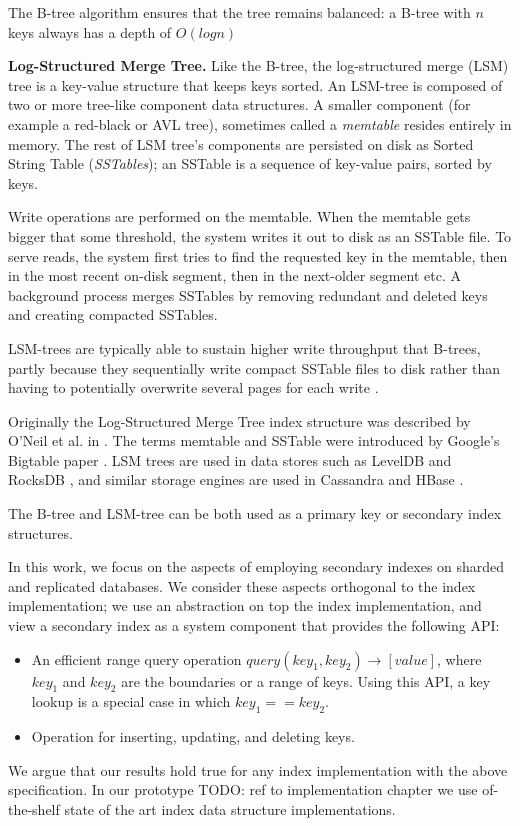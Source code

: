 The B-tree algorithm ensures that the tree remains balanced: a B-tree with $n$ keys always has a depth of $O(log n)$

\medskip
\noindent
\textbf{Log-Structured Merge Tree.}
Like the B-tree, the log-structured merge (LSM) tree is a key-value structure that keeps keys sorted.
An LSM-tree is composed of two or more tree-like component data structures.
A smaller component (for example a red-black or AVL tree), sometimes called a \textit{memtable} resides entirely in
memory.
The rest of LSM tree's components are persisted on disk as Sorted String Table (\textit{SSTables}); an SSTable is a
sequence of key-value pairs, sorted by keys.

Write operations are performed on the memtable.
When the memtable gets bigger that some threshold, the system writes it out to disk as an SSTable file.
To serve reads, the system first tries to find the requested key in the memtable, then in the most recent on-disk segment,
then in the next-older segment etc.
A background process merges SSTables by removing redundant and deleted keys and creating compacted SSTables.

LSM-trees are typically able to sustain higher write throughput that B-trees, partly because they sequentially write
compact SSTable files to disk rather than having to potentially overwrite several pages for each write \cite{lsm:vsbtree}.

Originally the Log-Structured Merge Tree index structure was described by O'Neil et al. in \cite{oneil:lsmtree}.
The terms memtable and SSTable were introduced by Google's Bigtable paper \cite{chang:bigtable}.
LSM trees are used in data stores such as LevelDB \cite{leveldb:implnotes} and RocksDB \cite{rocksdb:history},
and similar storage engines are used in Cassandra and HBase \cite{hbase:hfile}.

\bigskip
\noindent
The B-tree and LSM-tree can be both used as a primary key or secondary index structures.

In this work, we focus on the aspects of employing secondary indexes on sharded and replicated databases.
We consider these aspects orthogonal to the index implementation;
we use an abstraction on top the index implementation, and view a secondary index as a system component that provides
the following API:
\begin{itemize}
  \item An efficient range query operation $query(key_1, key_2) \rightarrow [value]$,
  where $key_1$ and $key_2$ are the boundaries or a range of keys.
  Using this API, a key lookup is a special case in which $key_1 == key_2$.

  \item Operation for inserting, updating, and deleting keys.
\end{itemize}
We argue that our results hold true for any index implementation with the above specification.
In our prototype
TODO: ref to implementation chapter
we use of-the-shelf state of the art index data structure implementations.

